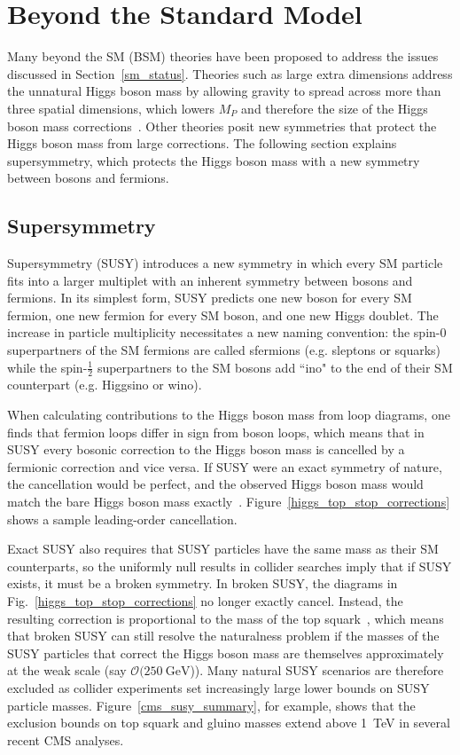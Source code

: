 \section{Beyond the Standard Model}
Many beyond the SM (BSM) theories have been proposed to address the issues discussed in Section~\ref{sm_status}. Theories such as large extra dimensions address the unnatural Higgs boson mass by allowing gravity to spread across more than three spatial dimensions, which lowers $M_P$ and therefore the size of the Higgs boson mass corrections~\cite{add}. Other theories posit new symmetries that protect the Higgs boson mass from large corrections. The following section explains supersymmetry, which protects the Higgs boson mass with a new symmetry between bosons and fermions.

\subsection{Supersymmetry}
\label{susy}
Supersymmetry (SUSY) introduces a new symmetry in which every SM particle fits into a larger multiplet with an inherent symmetry between bosons and fermions. In its simplest form, SUSY predicts one new boson for every SM fermion, one new fermion for every SM boson, and one new Higgs doublet. The increase in particle multiplicity necessitates a new naming convention: the spin-0 superpartners of the SM fermions are called sfermions (e.g. sleptons or squarks) while the spin-$\frac{1}{2}$ superpartners to the SM bosons add ``ino" to the end of their SM counterpart (e.g. Higgsino or wino).

When calculating contributions to the Higgs boson mass from loop diagrams, one finds that fermion loops differ in sign from boson loops, which means that in SUSY every bosonic correction to the Higgs boson mass is cancelled by a fermionic correction and vice versa. If SUSY were an exact symmetry of nature, the cancellation would be perfect, and the observed Higgs boson mass would match the bare Higgs boson mass exactly~\cite{susy_primer}. Figure~\ref{higgs_top_stop_corrections} shows a sample leading-order cancellation.



Exact SUSY also requires that SUSY particles have the same mass as their SM counterparts, so the uniformly null results in collider searches imply that if SUSY exists, it must be a broken symmetry. In broken SUSY, the diagrams in Fig.~\ref{higgs_top_stop_corrections} no longer exactly cancel. Instead, the resulting correction is proportional to the mass of the top squark~\cite{craig_susy_run1}, which means that broken SUSY can still resolve the naturalness problem if the masses of the SUSY particles that correct the Higgs boson mass are themselves approximately at the weak scale (say $\mathcal{O}(\SI{250}{\GeV}$)). Many natural SUSY scenarios are therefore excluded as collider experiments set increasingly large lower bounds on SUSY particle masses. Figure~\ref{cms_susy_summary}, for example, shows that the exclusion bounds on top squark and gluino masses extend above \SI{1}{\TeV} in several recent CMS analyses. 

